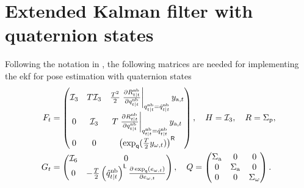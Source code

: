 \section{Extended Kalman filter with quaternion states}
Following the notation in , the following matrices are needed for implementing the \gls{ekf} for pose estimation with quaternion states
\begin{subequations}
\label{eq:app-poseEst-ekfMeas}
\begin{align}
F_t &= \begin{pmatrix} \mathcal{I}_3 & T \mathcal{I}_3 & \tfrac{T^2}{2} \left. \tfrac{\partial R^\text{nb}_{t \mid t}}{\partial q^\text{nb}_{t \mid t}} \right|_{q^\text{nb}_{t \mid t}=\hat{q}^\text{nb}_{t \mid t}} y_{\text{a},t} \\
0 & \mathcal{I}_3 & T \left. \tfrac{\partial R^\text{nb}_{t \mid t}}{\partial q^\text{nb}_{t \mid t}} \right|_{q^\text{nb}_{t \mid t}=\hat{q}^\text{nb}_{t \mid t}} y_{\text{a},t} \\
0 & 0 & \left( \expq ( \tfrac{T}{2} y_{\omega,t} ) \right)^\rightMult \end{pmatrix}, \quad
H = \mathcal{I}_3, \quad R = \Sigma_\text{p},
 \\
G_t &= \begin{pmatrix} \mathcal{I}_6 & 0 \\ 0 & -\tfrac{T}{2} \left( \hat{q}^\text{nb}_{t \mid t} \right)^\leftMult \tfrac{\diff \expq (e_{\omega,t})}{\diff e_{\omega,t}} \end{pmatrix}, %
\quad
Q = \begin{pmatrix} \Sigma_\text{a} & 0 & 0 \\ 0 & \Sigma_\text{a} & 0 \\ 0 & 0 & \Sigma_\omega \end{pmatrix}. 
\end{align}
\end{subequations}


